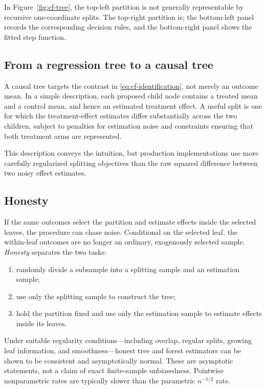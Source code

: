 In Figure~\ref{fig:cf-tree}, the top-left partition is not generally representable
by recursive one-coordinate splits.  The top-right partition is; the bottom-left
panel records the corresponding decision rules, and the bottom-right panel shows
the fitted step function.

\subsection{From a regression tree to a causal tree}
\label{sec:cf-causal-tree}

A causal tree targets the contrast in \eqref{eq:cf-identification}, not merely an
outcome mean.  In a simple description, each proposed child node contains a treated
mean and a control mean, and hence an estimated treatment effect.  A useful split is
one for which the treatment-effect estimates differ substantially across the two
children, subject to penalties for estimation noise and constraints ensuring that
both treatment arms are represented.

This description conveys the intuition, but production implementations use more
carefully regularized splitting objectives than the raw squared difference between
two noisy effect estimates.

\subsection{Honesty}
\label{sec:cf-honesty}

If the same outcomes select the partition and estimate effects inside the selected
leaves, the procedure can chase noise.  Conditional on the selected leaf, the
within-leaf outcomes are no longer an ordinary, exogenously selected sample.
\emph{Honesty} separates the two tasks:

\begin{enumerate}
  \item randomly divide a subsample into a splitting sample and an estimation
  sample;
  \item use only the splitting sample to construct the tree;
  \item hold the partition fixed and use only the estimation sample to estimate
  effects inside its leaves.
\end{enumerate}

Under suitable regularity conditions---including overlap, regular splits, growing
leaf information, and smoothness---honest tree and forest estimators can be shown
to be consistent and asymptotically normal.  These are asymptotic statements, not a
claim of exact finite-sample unbiasedness.  Pointwise nonparametric rates are
typically slower than the parametric $n^{-1/2}$ rate.

